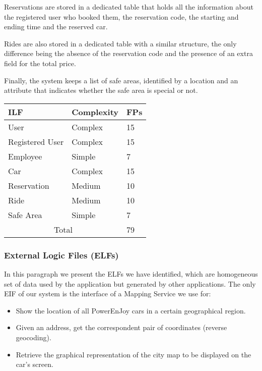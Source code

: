 Reservations are stored in a dedicated table that holds all the information about the registered user who booked them, the reservation code, the starting and ending time and the reserved car.

Rides are also stored in a dedicated table with a similar structure, the only difference being the absence of the reservation code and the presence of an extra field for the total price.

Finally, the system keeps a list of safe areas, identified by a location and an attribute that indicates whether the safe area is special or not.

\begin{table}[H]
	\centering
	\begin{tabular}{| m{3cm} | m{2.5cm} | m{1cm} |}
		\hline
		\textbf{ILF} & \textbf{Complexity} & \textbf{FPs}\\
		\hline
		User & Complex & 15\\
		Registered User & Complex & 15\\
		Employee & Simple & 7\\
		Car & Complex & 15\\
		Reservation & Medium & 10\\
		Ride & Medium & 10\\
		Safe Area & Simple & 7\\
		\hline
		\multicolumn{2}{|c|}{Total} & 79\\
		\hline
	\end{tabular}
\end{table}

\subsubsection{External Logic Files (ELFs)}
In this paragraph we present the ELFs we have identified, which are homogeneous set of data used by the application but generated by other applications.
The only EIF of our system is the interface of a Mapping Service we use for:
\begin{itemize}
	\item Show the location of all PowerEnJoy cars in a certain geographical region.
	\item Given an address, get the correspondent pair of coordinates (reverse geocoding).
	\item Retrieve the graphical representation of the city map to be displayed on the car's screen.
\end{itemize}

